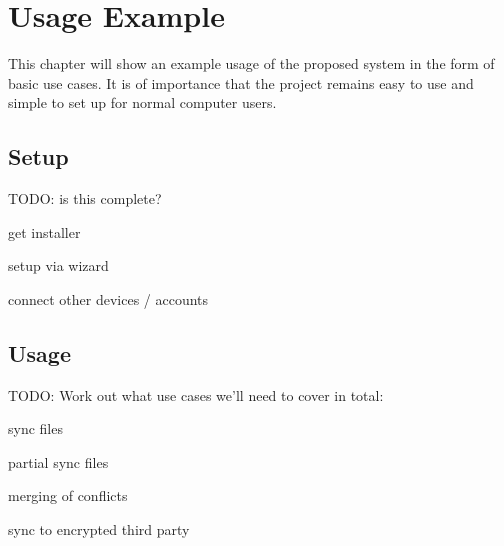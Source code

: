\chapter{Usage Example}

This chapter will show an example usage of the proposed system in the form of basic use cases.
It is of importance that the project remains easy to use and simple to set up for normal computer users.

\section{Setup}

TODO: is this complete?

get installer

setup via wizard

connect other devices / accounts

\section{Usage}

TODO: Work out what use cases we'll need to cover in total:

sync files

partial sync files

merging of conflicts

sync to encrypted third party
